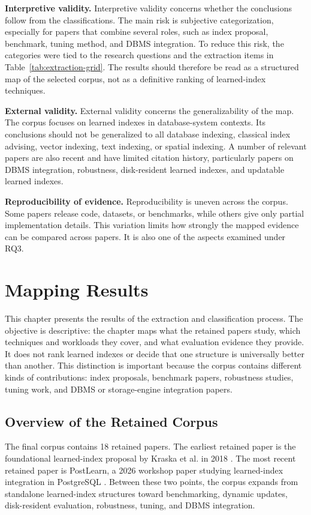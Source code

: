 \documentclass[a4paper, 12pt, twoside]{report}
\begin{document}
\textbf{Interpretive validity.} Interpretive validity concerns whether the conclusions follow from the classifications. The main risk is subjective categorization, especially for papers that combine several roles, such as index proposal, benchmark, tuning method, and DBMS integration. To reduce this risk, the categories were tied to the research questions and the extraction items in Table~\ref{tab:extraction-grid}. The results should therefore be read as a structured map of the selected corpus, not as a definitive ranking of learned-index techniques.

\textbf{External validity.} External validity concerns the generalizability of the map. The corpus focuses on learned indexes in database-system contexts. Its conclusions should not be generalized to all database indexing, classical index advising, vector indexing, text indexing, or spatial indexing. A number of relevant papers are also recent and have limited citation history, particularly papers on DBMS integration, robustness, disk-resident learned indexes, and updatable learned indexes.

\textbf{Reproducibility of evidence.} Reproducibility is uneven across the corpus. Some papers release code, datasets, or benchmarks, while others give only partial implementation details. This variation limits how strongly the mapped evidence can be compared across papers. It is also one of the aspects examined under RQ3.

\chapter{Mapping Results}

This chapter presents the results of the extraction and classification process. The objective is descriptive: the chapter maps what the retained papers study, which techniques and workloads they cover, and what evaluation evidence they provide. It does not rank learned indexes or decide that one structure is universally better than another. This distinction is important because the corpus contains different kinds of contributions: index proposals, benchmark papers, robustness studies, tuning work, and DBMS or storage-engine integration papers.

\section{Overview of the Retained Corpus}

The final corpus contains 18 retained papers. The earliest retained paper is the foundational learned-index proposal by Kraska et al. in 2018 \cite{kraska2018}. The most recent retained paper is PostLearn, a 2026 workshop paper studying learned-index integration in PostgreSQL \cite{fuad2026postlearn}. Between these two points, the corpus expands from standalone learned-index structures toward benchmarking, dynamic updates, disk-resident evaluation, robustness, tuning, and DBMS integration.
\end{document}

